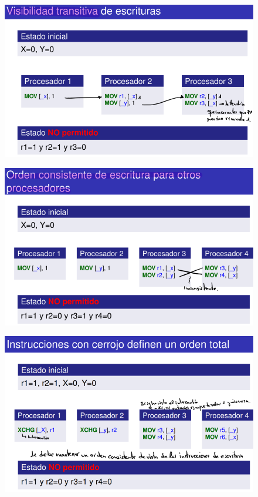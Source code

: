 \documentclass[12pt, twoside, openright]{report} %
\begin{document}
    \begin{figure}[H]
      {\includegraphics[scale=.5]{Untitled 67.png}}
    \end{figure}
    \begin{figure}[H]
      {\includegraphics[scale=.5]{Untitled 68.png}}
    \end{figure}
    \begin{figure}[H]
      {\includegraphics[scale=.5]{Untitled 69.png}}
    \end{figure}
\end{document}

